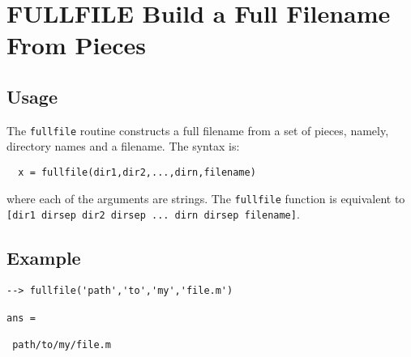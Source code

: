 \section{FULLFILE Build a Full Filename From Pieces}

\subsection{Usage}

The \verb|fullfile| routine constructs a full filename from a set of
pieces, namely, directory names and a filename.  The syntax is:
\begin{verbatim}
  x = fullfile(dir1,dir2,...,dirn,filename)
\end{verbatim}
where each of the arguments are strings.  The \verb|fullfile| function
is equivalent to \verb|[dir1 dirsep dir2 dirsep ... dirn dirsep filename]|.
\subsection{Example}

\begin{verbatim}
--> fullfile('path','to','my','file.m')

ans = 

 path/to/my/file.m
\end{verbatim}
